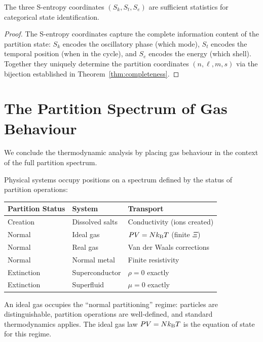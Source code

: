 \begin{theorem}
\label{thm:s_sufficiency}
The three S-entropy coordinates $(S_k, S_t, S_e)$ are sufficient statistics for categorical state identification.
\end{theorem}

\begin{proof}
The S-entropy coordinates capture the complete information content of the partition state: $S_k$ encodes the oscillatory phase (which mode), $S_t$ encodes the temporal position (when in the cycle), and $S_e$ encodes the energy (which shell). Together they uniquely determine the partition coordinates $(n, \ell, m, s)$ via the bijection established in Theorem~\ref{thm:completeness}.
\end{proof}

\section{The Partition Spectrum of Gas Behaviour}
\label{sec:spectrum}

We conclude the thermodynamic analysis by placing gas behaviour in the context of the full partition spectrum.

\begin{definition}
Physical systems occupy positions on a spectrum defined by the status of partition operations:
\begin{center}
\begin{tabular}{lll}
\toprule
Partition Status & System & Transport \\
\midrule
Creation & Dissolved salts & Conductivity (ions created) \\
Normal & Ideal gas & $PV = Nk_{\mathrm{B}} T$ (finite $\Xi$) \\
Normal & Real gas & Van der Waals corrections \\
Normal & Normal metal & Finite resistivity \\
Extinction & Superconductor & $\rho = 0$ exactly \\
Extinction & Superfluid & $\mu = 0$ exactly \\
\bottomrule
\end{tabular}
\end{center}
\end{definition}

An ideal gas occupies the ``normal partitioning'' regime: particles are distinguishable, partition operations are well-defined, and standard thermodynamics applies. The ideal gas law $PV = Nk_{\mathrm{B}} T$ is the equation of state for this regime.

